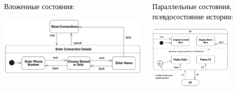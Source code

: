 \documentclass{../mcsslides}
\begin{document}
\begin{frame}
        \begin{columns}
            \begin{column}{0.5\textwidth}
                Вложенные состояния:
                \begin{center}
                    \includegraphics[width=\textwidth]{stateTransitionNestedStates.png}
                \end{center}
            \end{column}
            \begin{column}{0.5\textwidth}
                Параллельные состояния, псевдосостояние истории:
                \begin{center}
                    \includegraphics[width=0.7\textwidth]{stateTransitionParallelStates.png}
                \end{center}
            \end{column}
        \end{columns}
    \end{frame}
\end{document}
